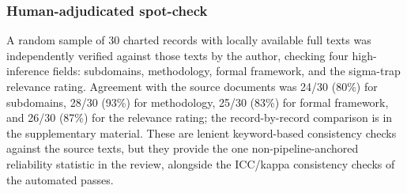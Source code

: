 \subsubsection{Human-adjudicated spot-check}
A random sample of 30 charted records with locally available full texts was independently verified against those texts by the author, checking four high-inference fields: subdomains, methodology, formal framework, and the sigma-trap relevance rating. Agreement with the source documents was 24/30 (80\%) for subdomains, 28/30 (93\%) for methodology, 25/30 (83\%) for formal framework, and 26/30 (87\%) for the relevance rating; the record-by-record comparison is in the supplementary material. These are lenient keyword-based consistency checks against the source texts, but they provide the one non-pipeline-anchored reliability statistic in the review, alongside the ICC/kappa consistency checks of the automated passes.

